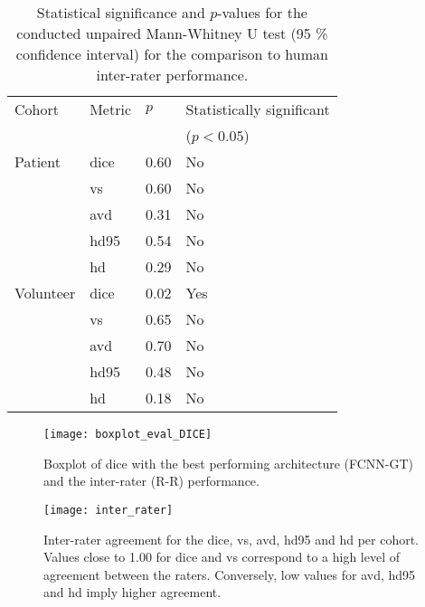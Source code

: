 \begin{table}[htbp]
   \centering
   \caption[Statistics for Comparison to Inter-Rater Performance]{Statistical significance and $p$-values for the conducted unpaired Mann-Whitney U test (95 \% confidence interval) for the comparison to human inter-rater performance.}
   \begin{tabular}{l*{3}{l}}
      \toprule
        Cohort	    & Metric        & $p$       & Statistically significant\\
      			    &               &           &($p < 0.05$)          \\
      \midrule
        Patient     & \gls{dice}    & 0.60      & No\\
                    & \gls{vs}      & 0.60      & No\\
                    & \gls{avd}     & 0.31      & No\\
                    & \gls{hd95}    & 0.54      & No\\
                    & \gls{hd}      & 0.29      & No\\
        \midrule
        Volunteer   & \gls{dice}    & 0.02      & Yes\\
                    & \gls{vs}      & 0.65      & No\\
                    & \gls{avd}     & 0.70      & No\\
                    & \gls{hd95}    & 0.48      & No\\
                    & \gls{hd}      & 0.18      & No\\
      \bottomrule
   \end{tabular}
   \label{tab:res_fcnn_rater_statistics}
\end{table}

\begin{figure}[htbp]
	\centering
	\texttt{[image: boxplot\_eval\_DICE]}
    \caption[Boxplot of the \acrlong{dice} compared to the inter-rater performance]{Boxplot of \acrlong{dice} with the best performing architecture (FCNN-GT) and the inter-rater (R-R) performance.}
    \label{fig:results_eval_boxplot_dice}
\end{figure}

\begin{figure}[htbp]	
	\texttt{[image: inter\_rater]}
    \caption[Heatmap for Inter-Rater Agreement]{Inter-rater agreement for the \acrlong{dice}, \acrlong{vs}, \acrlong{avd}, \acrlong{hd95} and \acrlong{hd} per cohort. Values close to 1.00 for \gls{dice} and \gls{vs} correspond to a high level of agreement between the raters. Conversely, low values for \gls{avd}, \gls{hd95} and \gls{hd} imply higher agreement.}
    \label{fig:res_inter_rater}
\end{figure}

